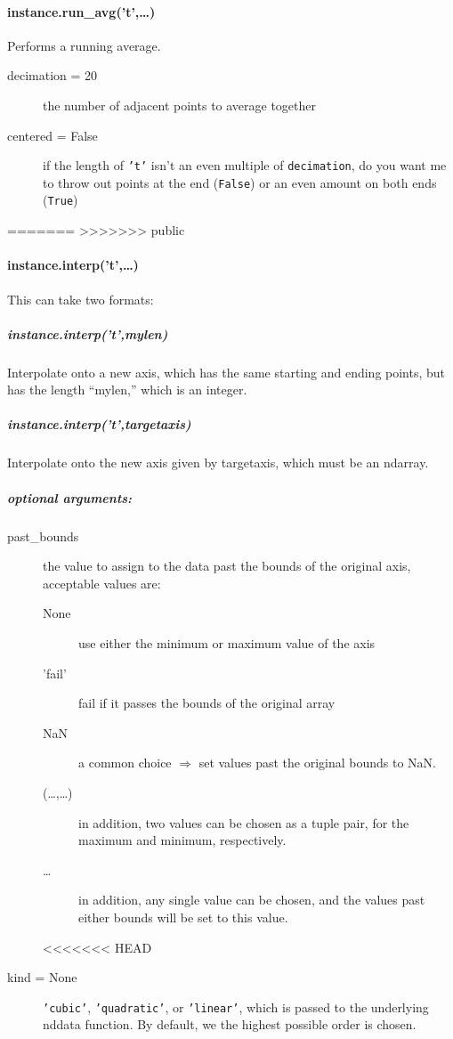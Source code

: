\paragraph{instance.run\_avg('t',\ldots)}
Performs a running average.
\begin{mykwargs}
    \begin{description}
        \item[decimation = 20] the number of adjacent points to average together
        \item[centered = False] if the length of \texttt{'t'} isn't an even multiple of \texttt{decimation}, do you want me to throw out points at the end (\texttt{False}) or an even amount on both ends (\texttt{True})
    \end{description}
\end{mykwargs}
=======
>>>>>>> public
\paragraph{instance.interp('t',\ldots)}
This can take two formats:
\subparagraph{instance.interp('t',mylen)}
Interpolate onto a new axis, which has the same starting and ending points, but has the length ``mylen,'' which is an integer.
\subparagraph{instance.interp('t',targetaxis)}
Interpolate onto the new axis given by targetaxis, which must be an ndarray.
\subparagraph{optional arguments:}
\begin{mykwargs}
    \begin{description}
        \item[past\_bounds] the value to assign to the data past the bounds of the original axis, acceptable values are:
            \begin{description}
                \item[None] use either the minimum or maximum value of the axis
                \item['fail'] fail if it passes the bounds of the original array 
                \item[NaN] a common choice $\Rightarrow$ set values past the original bounds to NaN. 
                \item[(\ldots,\ldots)] in addition, two values can be chosen as a tuple pair, for the maximum and minimum, respectively.
                \item[\ldots] in addition, any single value can be chosen, and the values past either bounds will be set to this value.
            \end{description}
<<<<<<< HEAD
        \item[kind = None] \texttt{'cubic'}, \texttt{'quadratic'}, or \texttt{'linear'}, which is passed to the underlying nddata function.
            By default, we the highest possible order is chosen.
    \end{description}
\end{mykwargs}
